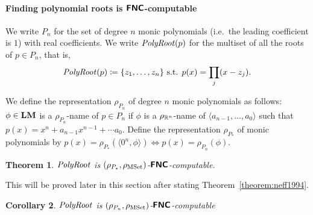 \documentclass{article}
\newtheorem{theorem}{Theorem}[section]
\newtheorem{corollary}[theorem]{Corollary}
\theoremstyle{definition}
\theoremstyle{remark}
\begin{document}
\paragraph{Finding polynomial roots is $\text{\bfseries \sffamily \upshape FNC}$-computable}

We write $P_n$ for the set of degree $n$ monic 
polynomials (i.e.\ the leading coefficient is $1$) with real coefficients.
We write $\mathit{PolyRoot}(p)$ for the multiset of all the roots of $p \in P_n$, that is,
\begin{equation}
 \mathit{PolyRoot}(p) \coloneqq \{ z_1, \dots, z_n \} \text{ s.t. } p(x) = \prod_j (x - z_j).
\end{equation}

We define the representation $\rho_{P_n}$ of degree $n$ monic polynomials as follows: 
$\phi \in \mathbf{LM}$ is a $\rho_{P_n}$-name of $p \in P_n$ 
if $\phi$ is a $\rho_{\mathbb R^n}$-name of $\langle a_{n-1}, \dots, a_0 \rangle$ 
such that $p(x) = x^n + a_{n-1}x^{n-1} + \cdots a_0$.
Define the representation $\rho_{P_*}$ of monic polynomials by
$p(x) = \rho_{P_*}(\langle 0^n, \phi \rangle) \iff p(x) = \rho_{P_n}(\phi)$.


\begin{theorem}
 \label{theorem:finding-roots-is-in-NC}
 $\mathit{PolyRoot}$ is $(\rho_{P_*}, \rho_{\mathrm{MSet}})$-$\text{\bfseries \sffamily \upshape FNC}$-computable.
\end{theorem}

This will be proved later in this section
after stating Theorem~\ref{theorem:neff1994}. 

\begin{corollary}
 $\mathit{PolyRoot}$ is $(\rho_{P_n}, \rho_{\mathrm{MSet}})$-$\text{\bfseries \sffamily \upshape FNC}$-computable
\end{corollary}
\end{document}
